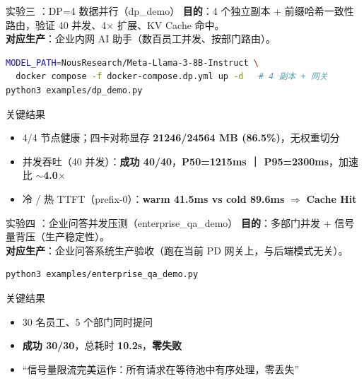 \documentclass[aspectratio=169,11pt]{beamer}
\newcommand{\cnum}[1]{\tikz[baseline=(c.base)]{\node[draw,circle,inner sep=1.2pt,line width=0.5pt](c){\scriptsize #1};}}
\begin{document}
\begin{frame}[fragile]{实验三 \cnum{3}：DP=4 数据并行（dp\_demo）}
\textbf{目的}：4 个独立副本 + 前缀哈希一致性路由，验证 40 并发、4$\times$ 扩展、KV Cache 命中。\\
\textbf{对应生产}：企业内网 AI 助手（数百员工并发、按部门路由）。
\vspace{1mm}
\begin{lstlisting}[language=bash]
MODEL_PATH=NousResearch/Meta-Llama-3-8B-Instruct \
  docker compose -f docker-compose.dp.yml up -d   # 4 副本 + 网关
python3 examples/dp_demo.py
\end{lstlisting}
\begin{block}{关键结果}
\small
\begin{itemize}
  \item 4/4 节点健康；四卡对称显存 \textbf{21246/24564 MB (86.5\%)}，无权重切分
  \item 并发吞吐（40 并发）：\textbf{成功 40/40}，\textbf{P50=1215ms ｜ P95=2300ms}，加速比 \textbf{$\sim$4.0$\times$}
  \item 冷 / 热 TTFT（prefix-0）：\textbf{warm 41.5ms vs cold 89.6ms} $\Rightarrow$ \textbf{Cache Hit}
\end{itemize}
\end{block}
\end{frame}

\begin{frame}[fragile]{实验四 \cnum{4}：企业问答并发压测（enterprise\_qa\_demo）}
\textbf{目的}：多部门并发 + 信号量背压（生产稳定性）。\\
\textbf{对应生产}：企业问答系统生产验收（跑在当前 PD 网关上，与后端模式无关）。
\vspace{1mm}
\begin{lstlisting}[language=bash]
python3 examples/enterprise_qa_demo.py
\end{lstlisting}
\begin{block}{关键结果}
\small
\begin{itemize}
  \item 30 名员工、5 个部门同时提问
  \item \textbf{成功 30/30}，总耗时 \textbf{10.2s}，\textbf{零失败}
  \item “信号量限流完美运作：所有请求在等待池中有序处理，零丢失”
\end{itemize}
\end{block}
\end{frame}
\end{document}
